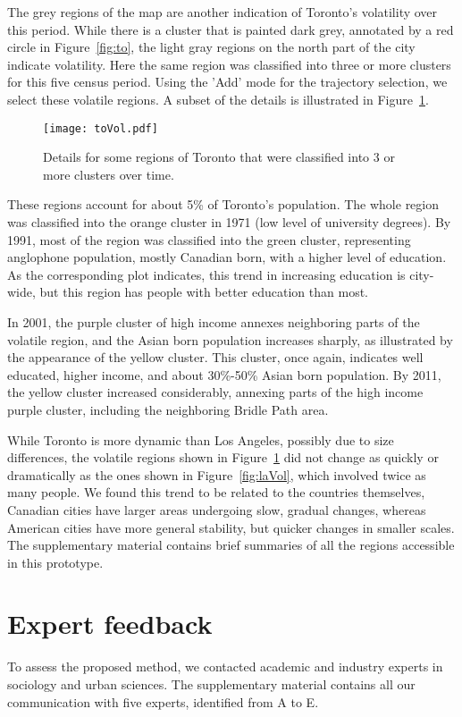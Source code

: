 The grey regions of the map are another indication of Toronto's volatility over
this period. While there is a cluster that is painted dark grey, annotated by a
red circle in Figure~\ref{fig:to}, the light gray regions on the north part of the
city indicate volatility. Here the same region was classified into three or more
clusters for this five census period. Using the 'Add' mode for the trajectory
selection, we select these volatile regions. A subset of the details is
illustrated in Figure~\ref{fig:toVol}. 

\begin{figure}
    \centering 
    \texttt{[image: toVol.pdf]}
    \caption{Details for some regions of Toronto that were classified into 3 or
         more clusters over time.\label{fig:toVol}}
\end{figure}

These regions account for about 5\% of Toronto's population. The whole region
was classified into the orange cluster in 1971 (low level of university degrees).
By 1991, most of the region was classified into the green cluster, representing
anglophone population, mostly Canadian born, with a higher level of education.
As the corresponding plot indicates, this trend in increasing education is
city-wide, but this region has people with better education than most.

In 2001, the purple cluster of high income annexes neighboring parts of the
volatile region, and the Asian born population increases sharply, as illustrated
by the appearance of the yellow cluster.  This cluster, once again, indicates
well educated, higher income, and about 30\%-50\% Asian born population. By
2011, the yellow cluster increased considerably, annexing parts of the high
income purple cluster, including the neighboring Bridle Path area.


While Toronto is more dynamic than Los Angeles, possibly due to size
differences, the volatile regions shown in Figure~\ref{fig:toVol} did not change as
quickly or dramatically as the ones shown in Figure~\ref{fig:laVol}, which involved
twice as many people. We found this trend to be related to the countries
themselves, Canadian cities have larger areas undergoing slow, gradual changes,
whereas American cities have more general stability, but quicker changes in
smaller scales. The supplementary material contains brief summaries of all the
regions accessible in this prototype.

\section{Expert feedback}
To assess the proposed method, we contacted academic and industry experts in
sociology and urban sciences. The supplementary material contains all our
communication with five experts, identified from A to E. 

